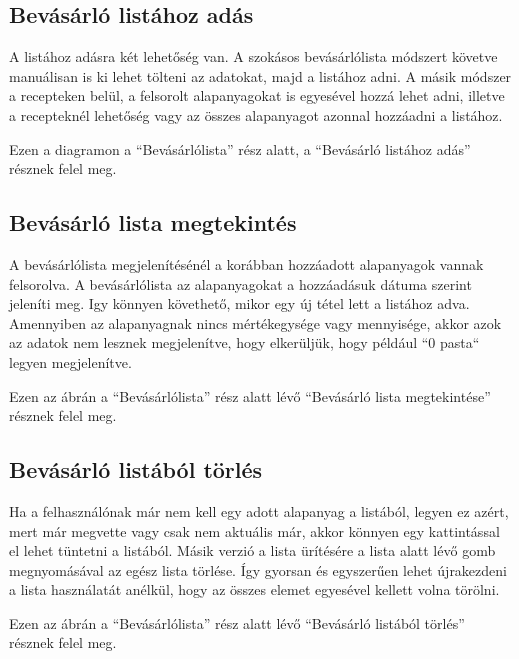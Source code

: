 \documentclass[12pt]{report}
\theoremstyle{definition}
\begin{document}
\subsection{Bevásárló listához adás}
A listához adásra két lehetőség van. A szokásos bevásárlólista módszert követve manuálisan is ki lehet tölteni az adatokat, majd a listához adni. A másik módszer a recepteken belül, a felsorolt alapanyagokat is egyesével hozzá lehet adni, illetve a recepteknél lehetőség vagy az összes alapanyagot azonnal hozzáadni a listához. 

Ezen a diagramon a “Bevásárlólista” rész alatt, a “Bevásárló listához adás” résznek felel meg.


\subsection{Bevásárló lista megtekintés}
A bevásárlólista megjelenítésénél a korábban hozzáadott alapanyagok vannak felsorolva. A bevásárlólista az alapanyagokat a hozzáadásuk dátuma szerint jeleníti meg. Igy könnyen követhető, mikor egy új tétel lett a listához adva.  Amennyiben az alapanyagnak nincs mértékegysége vagy mennyisége, akkor azok az adatok nem lesznek megjelenítve, hogy elkerüljük, hogy például “0 pasta“ legyen megjelenítve.

Ezen az ábrán a “Bevásárlólista” rész alatt lévő “Bevásárló lista megtekintése” résznek felel meg.


\subsection{Bevásárló listából törlés}
Ha a felhasználónak már nem kell egy adott alapanyag a listából, legyen ez azért, mert már megvette vagy csak nem aktuális már, akkor könnyen egy kattintással el lehet tüntetni a listából. Másik verzió a lista ürítésére a lista alatt lévő gomb megnyomásával az egész lista törlése. Így gyorsan és egyszerűen lehet újrakezdeni a lista használatát anélkül, hogy az összes elemet egyesével kellett volna törölni.

Ezen az ábrán a “Bevásárlólista” rész alatt lévő “Bevásárló listából törlés” résznek felel meg.


\end{document}
